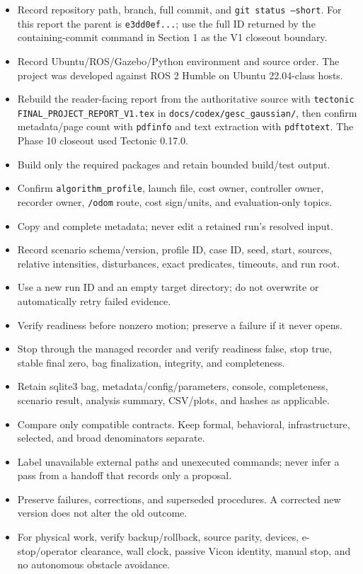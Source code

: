 \documentclass[
  10pt,
  letterpaper,
]{article}
\providecommand{\tightlist}{%
  \setlength{\itemsep}{0pt}\setlength{\parskip}{0pt}}
\begin{document}
\begin{itemize}
\tightlist
\item[$\square$]
  Record repository path, branch, full commit, and \texttt{git status --short}.
  For this report the parent is \nolinkurl{e3dd0ef...}; use the full ID returned by the
  containing-commit command in Section 1 as the V1 closeout boundary.
\item[$\square$]
  Record Ubuntu/ROS/Gazebo/Python environment and source order. The project
  was developed against ROS 2 Humble on Ubuntu 22.04-class hosts.
\item[$\square$]
  Rebuild the reader-facing report from the authoritative source with
  \texttt{tectonic FINAL\_PROJECT\_REPORT\_V1.tex} in
  \nolinkurl{docs/codex/gesc\_gaussian/}, then confirm metadata/page count with
  \nolinkurl{pdfinfo} and text extraction with \nolinkurl{pdftotext}. The Phase 10
  closeout used Tectonic 0.17.0.
\item[$\square$]
  Build only the required packages and retain bounded build/test output.
\item[$\square$]
  Confirm \nolinkurl{algorithm\_profile}, launch file, cost owner, controller owner,
  recorder owner, \nolinkurl{/odom} route, cost sign/units, and evaluation-only topics.
\item[$\square$]
  Copy and complete metadata; never edit a retained run's resolved input.
\item[$\square$]
  Record scenario schema/version, profile ID, case ID, seed, start,
  sources, relative intensities, disturbances, exact predicates, timeouts, and
  run root.
\item[$\square$]
  Use a new run ID and an empty target directory; do not overwrite or
  automatically retry failed evidence.
\item[$\square$]
  Verify readiness before nonzero motion; preserve a failure if it never
  opens.
\item[$\square$]
  Stop through the managed recorder and verify readiness false, stop true,
  stable final zero, bag finalization, integrity, and completeness.
\item[$\square$]
  Retain sqlite3 bag, metadata/config/parameters, console, completeness,
  scenario result, analysis summary, CSV/plots, and hashes as applicable.
\item[$\square$]
  Compare only compatible contracts. Keep formal, behavioral,
  infrastructure, selected, and broad denominators separate.
\item[$\square$]
  Label unavailable external paths and unexecuted commands; never infer a
  pass from a handoff that records only a proposal.
\item[$\square$]
  Preserve failures, corrections, and superseded procedures. A corrected
  new version does not alter the old outcome.
\item[$\square$]
  For physical work, verify backup/rollback, source parity, devices,
  e-stop/operator clearance, wall clock, passive Vicon identity, manual stop,
  and no autonomous obstacle avoidance.
\end{itemize}
\end{document}
